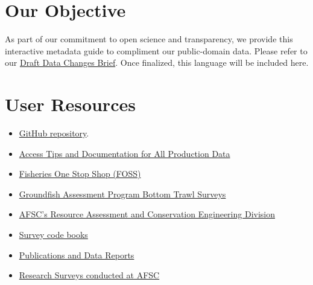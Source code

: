 \documentclass[
  letterpaper,
  oneside,
  open=any]{scrbook}
\begin{document}
\hypertarget{our-objective}{%
\section*{Our Objective}\label{our-objective}}


As part of our commitment to open science and transparency, we provide
this interactive metadata guide to compliment our public-domain data.
Please refer to our
\href{https://docs.google.com/document/d/1ie0it6G_V_PrpO1fYe-731Fvubuahn2yi0ixBIpaYO8/edit?usp=sharing}{Draft
Data Changes Brief}. Once finalized, this language will be included
here.

\hypertarget{user-resources}{%
\section*{User Resources}\label{user-resources}}


\begin{itemize}
\item
  \href{https://github.com/afsc-gap-products/gap_products}{GitHub
  repository}.
\item
  \href{https://afsc-gap-products.github.io/gap_products/}{Access Tips
  and Documentation for All Production Data}
\item
  \href{https://www.fisheries.noaa.gov/foss}{Fisheries One Stop Shop
  (FOSS)}
\item
  \href{https://www.fisheries.noaa.gov/alaska/science-data/groundfish-assessment-program-bottom-trawl-surveys}{Groundfish
  Assessment Program Bottom Trawl Surveys}
\item
  \href{https://www.fisheries.noaa.gov/about/resource-assessment-and-conservation-engineering-division}{AFSC's
  Resource Assessment and Conservation Engineering Division}
\item
  \href{https://www.fisheries.noaa.gov/resource/document/groundfish-survey-species-code-manual-and-data-codes-manual}{Survey
  code books}
\item
  \href{https://repository.library.noaa.gov/}{Publications and Data
  Reports}
\item
  \href{https://www.fisheries.noaa.gov/alaska/ecosystems/alaska-fish-research-surveys}{Research
  Surveys conducted at AFSC}
\end{itemize}
\end{document}
